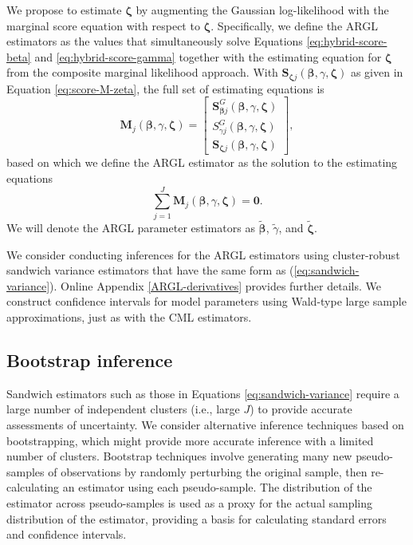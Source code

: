 \documentclass[
  man, donotrepeattitle,floatsintext]{apa7}
\begin{document}
We propose to estimate \(\boldsymbol\zeta\) by augmenting the Gaussian log-likelihood with the marginal score equation with respect to \(\boldsymbol\zeta\).
Specifically, we define the ARGL estimators as the values that simultaneously solve Equations \eqref{eq:hybrid-score-beta} and \eqref{eq:hybrid-score-gamma} together with the estimating equation for \(\boldsymbol\zeta\) from the composite marginal likelihood approach.
With \(\mathbf{S}_{\boldsymbol\zeta j}\left(\boldsymbol{\beta}, \gamma, \boldsymbol{\zeta}\right)\) as given in Equation \eqref{eq:score-M-zeta}, the full set of estimating equations is
\begin{equation}
\label{eq:hybrid-score}
\mathbf{M}_j(\boldsymbol\beta, \gamma, \boldsymbol\zeta) = \left[\begin{array}{c} \mathbf{S}^G_{\boldsymbol\beta j}(\boldsymbol\beta, \gamma, \boldsymbol\zeta) \\ S^G_{\gamma j}(\boldsymbol\beta, \gamma, \boldsymbol\zeta) \\ \mathbf{S}_{\boldsymbol\zeta j}(\boldsymbol\beta, \gamma, \boldsymbol\zeta) \end{array}\right],
\end{equation}
based on which we define the ARGL estimator as the solution to the estimating equations
\begin{equation}
\label{eq:hybrid-total-score}
\sum_{j=1}^J \mathbf{M}_j(\boldsymbol\beta, \gamma, \boldsymbol\zeta) = \mathbf{0}.
\end{equation}
We will denote the ARGL parameter estimators as \(\boldsymbol{\tilde\beta}\), \(\tilde\gamma\), and \(\boldsymbol{\tilde\zeta}\).

We consider conducting inferences for the ARGL estimators using cluster-robust sandwich variance estimators that have the same form as (\ref{eq:sandwich-variance}).
Online Appendix \ref{ARGL-derivatives} provides further details.
We construct confidence intervals for model parameters using Wald-type large sample approximations, just as with the CML estimators.

\subsection{Bootstrap inference}\label{bootstrap-inference}

Sandwich estimators such as those in Equations \eqref{eq:sandwich-variance} require a large number of independent clusters (i.e., large \(J\)) to provide accurate assessments of uncertainty.
We consider alternative inference techniques based on bootstrapping, which might provide more accurate inference with a limited number of clusters.
Bootstrap techniques involve generating many new pseudo-samples of observations by randomly perturbing the original sample, then re-calculating an estimator using each pseudo-sample.
The distribution of the estimator across pseudo-samples is used as a proxy for the actual sampling distribution of the estimator, providing a basis for calculating standard errors and confidence intervals.
\end{document}
